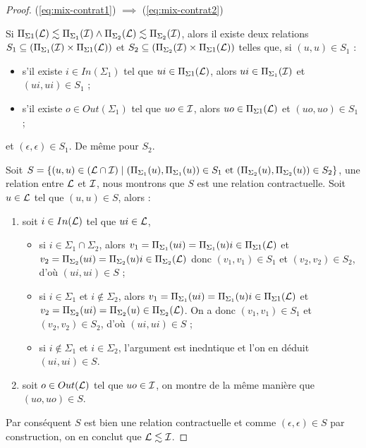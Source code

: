 \begin{proof}
(\ref{eq:mix-contrat1}) $\implies$ (\ref{eq:mix-contrat2})

Si $\Pi_{\Sigma1}({\cal L})\lesssim \Pi_{\Sigma_1}({\cal I}) \wedge \Pi_{\Sigma_2}({\cal L})\lesssim
\Pi_{\Sigma_2}({\cal I})$, alors il existe deux relations $S_1\subseteq
(\Pi_{\Sigma_1}({\cal I})\times{}\Pi_{\Sigma1}({\cal L}))$ et $S_2\subseteq
(\Pi_{\Sigma_2}({\cal I})\times{}\Pi_{\Sigma1}({\cal L}))$ telles que, si $(u,u)\in S_1$  :
\begin{itemize}
  \item s'il existe $i\in In(\Sigma_1)$ tel que $ui\in \Pi_{\Sigma1}({\cal L})$, alors
    $ui\in \Pi_{\Sigma_1}({\cal I})$ et $(ui,ui)\in S_1$ ;
  \item s'il existe $o\in Out(\Sigma_1)$ tel que $uo\in {\cal I}$, alors
    $uo\in \Pi_{\Sigma1}({\cal L})$ et $(uo,uo)\in S_1$ ;
\end{itemize}
et $(\epsilon, \epsilon)\in S_1$. De m\^eme pour $S_2$. 

Soit $S=\{(u,u)\in ({\cal L}\cap {\cal I}) \mid (\Pi_{\Sigma_1}(u),\Pi_{\Sigma_1}(u)) \in S_1
\mbox{~et~} (\Pi_{\Sigma_2}(u),\Pi_{\Sigma_2}(u))\in S_2\}$, une
relation entre $\cal L$ et $\cal I$, nous montrons que $S$ est une
relation contractuelle. 
Soit $u \in {\cal L}$ tel que $(u,u)\in S$, alors :
\begin{enumerate}
  \item soit $i \in In({\cal L})$ tel que $ui \in {\cal L}$, 
    \begin{itemize}
      \item si $i \in \Sigma_1\cap \Sigma_2$, alors
      $v_1=\Pi_{\Sigma_1}(ui)=\Pi_{\Sigma_1}(u)i \in \Pi_{\Sigma1}({\cal L})$ et
      $v_2=\Pi_{\Sigma_2}(ui)=\Pi_{\Sigma_2}(u)i\in \Pi_{\Sigma_2}({\cal L})$ donc
      $(v_1,v_1)\in S_1$ et $(v_2,v_2)\in S_2$, d'o\`u $(ui,ui)\in S$
      ;
    \item si $i\in \Sigma_1$ et $i\not\in \Sigma_2$, alors
    $v_1=\Pi_{\Sigma_1}(ui)=\Pi_{\Sigma_1}(u)i \in \Pi_{\Sigma1}({\cal L})$ et
    $v_2=\Pi_{\Sigma_2}(ui)=\Pi_{\Sigma_2}(u) \in \Pi_{\Sigma_2}({\cal L})$. On a donc
    $(v_1,v_1)\in S_1$ et $(v_2,v_2)\in S_2$, d'o\`u $(ui,ui)\in S$ ;
  \item si $i\not\in \Sigma_1$ et $i\in \Sigma_2$, l'argument est
  inedntique et l'on en d\'eduit  $(ui,ui)\in S$.
    \end{itemize}
  \item soit $o\in Out({\cal L})$ tel que $uo\in {\cal I}$, on montre
  de la m\^eme mani\`ere que $(uo,uo)\in S$.
\end{enumerate}
Par cons\'equent $S$ est bien une relation contractuelle et comme
$(\epsilon,\epsilon)\in S$ par construction, on en conclut que ${\cal
  L} \lesssim {\cal I}$.


\end{proof}
